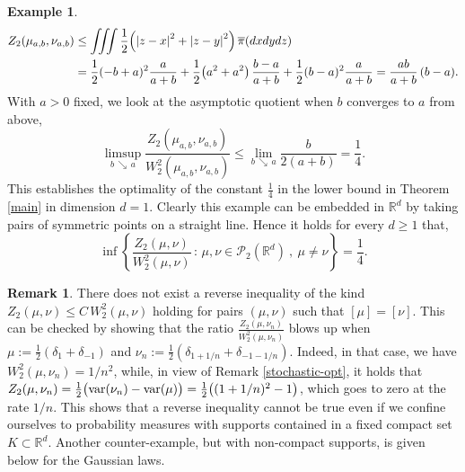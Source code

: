 \documentclass[11pt,reqno]{amsart}
\theoremstyle{definition}
\newtheorem{remark}[theorem]{Remark}
\newtheorem{example}[theorem]{Example}
\numberwithin{equation}{section}
\newcommand{\R}{\mathbb{R}}
\newcommand{\Rd}{{\R^d}}
\newcommand{\ov}{\overline}
\newcommand{\var}{{\rm{var}}}
\newcommand{\PP}{\mathcal{P}}
\newcommand{\abs}[1]{{\left \lvert #1 \right \rvert}}
\begin{document}
\begin{example}
    \begin{align*}
        Z_2(\mu_{a,b},\nu_{a,b}) &\leq \iiint \frac{1}{2} \Bigl( \abs{z-x}^2 + \abs{z-y}^2 \Bigr) \, \ov\pi(dxdydz) \\
        &=  \frac{1}{2} (-b+a)^2 \frac{a}{a+b} + \frac{1}{2} \big(a^2 + a^2\big) \,\frac{b-a}{a+b} +  \frac{1}{2} (b-a)^2 \frac{a}{a+b} = \frac{ab}{a+b}\,(b-a).
    \end{align*}
    With $a>0$ fixed, we look at the asymptotic quotient when $b$ converges to $a$ from above, 
    \begin{equation*}
        \limsup_{b \,\searrow \, a} \frac{Z_2(\mu_{a,b},\nu_{a,b})}{W_2^2(\mu_{a,b},\nu_{a,b})} \leq \lim_{b \,\searrow \, a}\frac{b}{2(a+b)} = \frac{1}{4}.
    \end{equation*}
    This establishes the optimality of the constant $\frac{1}{4}$ in the lower bound in Theorem \ref{main} in dimension $d=1$. Clearly this example can be embedded in $\R^d$
    by taking pairs of symmetric  points on a straight line.  Hence it holds for every $d\ge 1$ that,
     $$\inf \left\{\frac{Z_2(\mu,\nu) }{W_2^2(\mu,\nu)}\, :\, \mu,\nu \in \PP_2(\R^d) \ ,\ \mu\not=\nu\right\}= \frac1{4}.$$ 
\end{example}




\begin{remark}\label{noreverse}  There does not exist a reverse  inequality of the kind $Z_2(\mu,\nu) \le C\, W_2^2(\mu,\nu)$ holding for pairs $(\mu,\nu)$ such that
$[\mu]=[\nu]$. This can be checked by showing that the ratio $\frac{Z_2(\mu,\nu_n) }{W^2_2(\mu,\nu_n)}$ blows up when $\mu:= \frac1{2} (\delta_1+ \delta_{-1})$ and $\nu_n:= \frac1{2} (\delta_{1+1/n}+ \delta_{-1-1/n})$.
Indeed, in that case, we have $W^2_2(\mu,\nu_n)=1/n^2$, while, in view of  Remark \ref{stochastic-opt}, it holds that $Z_2(\mu,\nu_n)=\frac1{2} \big(\var (\nu_n) - \var(\mu)\big)= \frac1{2} \big((1+1/n)^2-1\big)$, which goes to zero at the rate $1/n$. This shows that a reverse inequality 
	cannot be true even if we confine ourselves to probability measures with supports contained in a fixed compact set $K \subset \Rd$. Another counter-example, but with non-compact supports, is given below for the Gaussian laws.

\end{remark}
\end{document}

